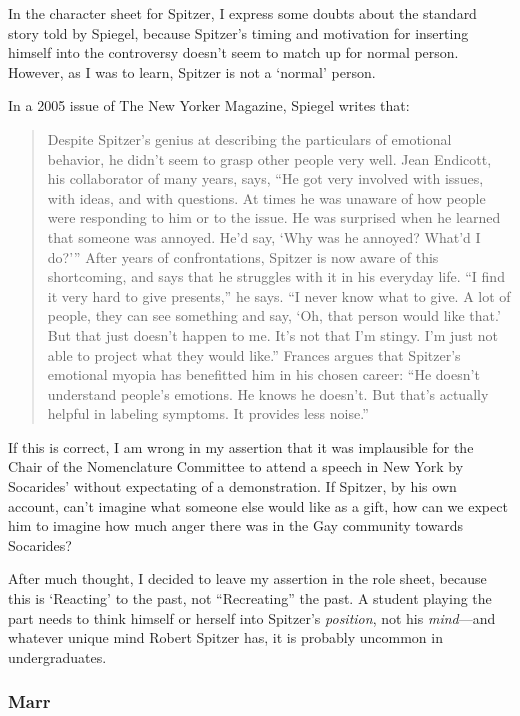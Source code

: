 \begin{refsection}
In the character sheet for Spitzer, I express some doubts about the standard story told by Spiegel, because Spitzer's timing and motivation for inserting himself into the controversy doesn't seem to match up for normal person. However, as I was to learn, Spitzer is not a `normal' person.

In a 2005 issue of The New Yorker Magazine, Spiegel writes that:

\begin{quote}

Despite Spitzer’s genius at describing the particulars of emotional behavior, he didn’t seem to grasp other people very well. Jean Endicott, his collaborator of many years, says, “He got very involved with issues, with ideas, and with questions. At times he was unaware of how people were responding to him or to the issue. He was surprised when he learned that someone was annoyed. He’d say, ‘Why was he annoyed? What’d I do?’” After years of confrontations, Spitzer is now aware of this shortcoming, and says that he struggles with it in his everyday life. “I find it very hard to give presents,” he says. “I never know what to give. A lot of people, they can see something and say, ‘Oh, that person would like that.’ But that just doesn’t happen to me. It’s not that I’m stingy. I’m just not able to project what they would like.” Frances argues that Spitzer’s emotional myopia has benefitted him in his chosen career: “He doesn’t understand people’s emotions. He knows he doesn’t. But that’s actually helpful in labeling symptoms. It provides less noise.”
\end{quote}

If this is correct, I am wrong in my assertion that it was implausible for the Chair of the Nomenclature Committee to attend a speech in New York by Socarides' without expectating of a demonstration. If Spitzer, by his own account, can't imagine what someone else would like as a gift, how can we expect him to imagine how much anger there was in the Gay community towards Socarides?

After much thought, I decided to leave my assertion in the role sheet, because this is `Reacting' to the past, not ``Recreating'' the past. A student playing the part needs to think himself or herself into Spitzer's \emph{position}, not his \emph{mind}---and whatever unique mind Robert Spitzer has, it is probably uncommon in undergraduates.

\subsubsection{Marr}
\label{marr}


\end{refsection}
